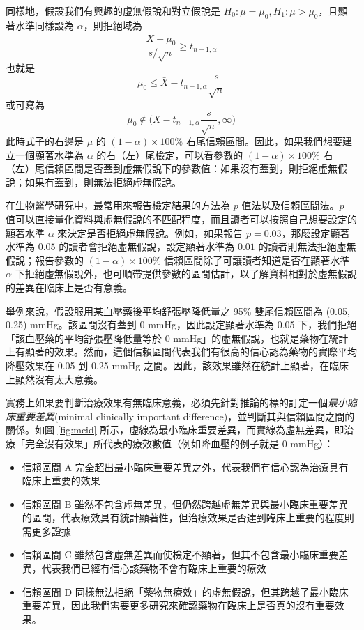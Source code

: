     \medskip

    同樣地，假設我們有興趣的虛無假說和對立假說是 $H_0: \mu = \mu_0, H_1: \mu > \mu_0$，且顯著水準同樣設為 $\alpha$，則拒絕域為
    \smallskip
    \[\frac{\bar{X}-\mu_0}{s/\sqrt{n}} \ge t_{n-1, \alpha}\]
    \smallskip
    也就是
    \smallskip
    \[\mu_0 \le \bar{X}-t_{n-1, \alpha}\frac{s}{\sqrt{n}}\]
    \smallskip
    或可寫為
    \smallskip
    \[\mu_0 \notin \Big(\bar{X} - t_{n-1, \alpha}\frac{s}{\sqrt{n}}, \infty\Big)\]
    \smallskip
    此時式子的右邊是 $\mu$ 的 $(1-\alpha)\times 100\%$ 右尾信賴區間。因此，如果我們想要建立一個顯著水準為 $\alpha$ 的右（左）尾檢定，可以看參數的 $(1-\alpha) \times 100\%$ 右（左）尾信賴區間是否蓋到虛無假說下的參數值：如果沒有蓋到，則拒絕虛無假說；如果有蓋到，則無法拒絕虛無假說。

    \medskip

    在生物醫學研究中，最常用來報告檢定結果的方法為 $p$ 值法以及信賴區間法。$p$ 值可以直接量化資料與虛無假說的不匹配程度，而且讀者可以按照自己想要設定的顯著水準 $\alpha$ 來決定是否拒絕虛無假說。例如，如果報告 $p=0.03$，那麼設定顯著水準為 $0.05$ 的讀者會拒絕虛無假說，設定顯著水準為 $0.01$ 的讀者則無法拒絕虛無假說；報告參數的 $(1-\alpha)\times 100\%$ 信賴區間除了可讓讀者知道是否在顯著水準 $\alpha$ 下拒絕虛無假說外，也可順帶提供參數的區間估計，以了解資料相對於虛無假說的差異在臨床上是否有意義。

    \medskip
    
    舉例來說，假設服用某血壓藥後平均舒張壓降低量之 95\% 雙尾信賴區間為 (0.05, 0.25) mmHg。該區間沒有蓋到 0 mmHg，因此設定顯著水準為 0.05 下，我們拒絕「該血壓藥的平均舒張壓降低量等於 0 mmHg」的虛無假說，也就是藥物在統計上有顯著的效果。然而，這個信賴區間代表我們有很高的信心認為藥物的實際平均降壓效果在 0.05 到 0.25 mmHg 之間。因此，該效果雖然在統計上顯著，在臨床上顯然沒有太大意義。
    
    \medskip
    
    實務上如果要判斷治療效果有無臨床意義，必須先針對推論的標的訂定一個\textit{最小臨床重要差異}(minimal clinically important difference)，並判斷其與信賴區間之間的關係。如圖 \ref{fig:mcid} 所示，虛線為最小臨床重要差異，而實線為虛無差異，即治療「完全沒有效果」所代表的療效數值（例如降血壓的例子就是 0 mmHg）：
    
    \begin{itemize}
        \item 信賴區間 A 完全超出最小臨床重要差異之外，代表我們有信心認為治療具有臨床上重要的效果
        \item 信賴區間 B 雖然不包含虛無差異，但仍然跨越虛無差異與最小臨床重要差異的區間，代表療效具有統計顯著性，但治療效果是否達到臨床上重要的程度則需更多證據
        \item 信賴區間 C 雖然包含虛無差異而使檢定不顯著，但其不包含最小臨床重要差異，代表我們已經有信心該藥物不會有臨床上重要的療效
        \item 信賴區間 D 同樣無法拒絕「藥物無療效」的虛無假說，但其跨越了最小臨床重要差異，因此我們需要更多研究來確認藥物在臨床上是否真的沒有重要效果。
    \end{itemize}

